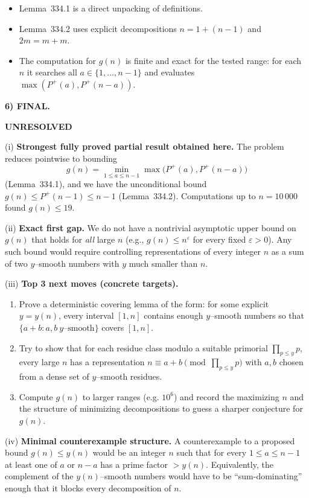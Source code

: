 \begin{itemize}
\item Lemma~334.1 is a direct unpacking of definitions.
\item Lemma~334.2 uses explicit decompositions $n=1+(n-1)$ and $2m=m+m$.
\item The computation for $g(n)$ is finite and exact for the tested range: for each $n$ it searches all $a\in\{1,\dots,n-1\}$ and evaluates $\max(P^+(a),P^+(n-a))$.
\end{itemize}

\medskip
\noindent\textbf{6) FINAL.}

\noindent\textbf{UNRESOLVED}

\smallskip
\noindent (i) \textbf{Strongest fully proved partial result obtained here.}
The problem reduces pointwise to bounding
\[
 g(n)=\min_{1\le a\le n-1}\max\bigl(P^+(a),P^+(n-a)\bigr)
\]
(Lemma~334.1), and we have the unconditional bound $g(n)\le P^+(n-1)\le n-1$ (Lemma~334.2). Computations up to $n=10\,000$ found $g(n)\le 19$.

\smallskip
\noindent (ii) \textbf{Exact first gap.}
We do not have a nontrivial asymptotic upper bound on $g(n)$ that holds for \emph{all} large $n$ (e.g., $g(n)\le n^\varepsilon$ for every fixed $\varepsilon>0$). Any such bound would require controlling representations of every integer $n$ as a sum of two $y$--smooth numbers with $y$ much smaller than $n$.

\smallskip
\noindent (iii) \textbf{Top 3 next moves (concrete targets).}
\begin{enumerate}
\item Prove a deterministic covering lemma of the form: for some explicit $y=y(n)$, every interval $[1,n]$ contains enough $y$--smooth numbers so that $\{a+b: a,b\ \text{$y$--smooth}\}$ covers $[1,n]$.
\item Try to show that for each residue class modulo a suitable primorial $\prod_{p\le y}p$, every large $n$ has a representation $n\equiv a+b\pmod{\prod_{p\le y}p}$ with $a,b$ chosen from a dense set of $y$--smooth residues.
\item Compute $g(n)$ to larger ranges (e.g. $10^6$) and record the maximizing $n$ and the structure of minimizing decompositions to guess a sharper conjecture for $g(n)$.
\end{enumerate}

\smallskip
\noindent (iv) \textbf{Minimal counterexample structure.}
A counterexample to a proposed bound $g(n)\le y(n)$ would be an integer $n$ such that for every $1\le a\le n-1$ at least one of $a$ or $n-a$ has a prime factor $>y(n)$. Equivalently, the complement of the $y(n)$--smooth numbers would have to be ``sum-dominating'' enough that it blocks every decomposition of $n$.



